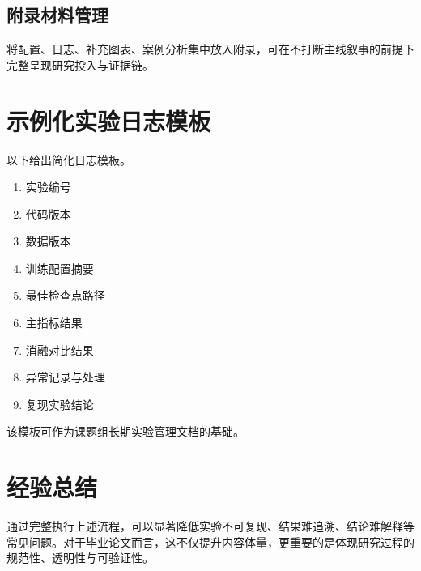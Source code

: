 \subsection{附录材料管理}
将配置、日志、补充图表、案例分析集中放入附录，可在不打断主线叙事的前提下完整呈现研究投入与证据链。

\section{示例化实验日志模板}
以下给出简化日志模板。
\begin{enumerate}
    \item 实验编号
    \item 代码版本
    \item 数据版本
    \item 训练配置摘要
    \item 最佳检查点路径
    \item 主指标结果
    \item 消融对比结果
    \item 异常记录与处理
    \item 复现实验结论
\end{enumerate}
\par\indent 该模板可作为课题组长期实验管理文档的基础。

\section{经验总结}
通过完整执行上述流程，可以显著降低实验不可复现、结果难追溯、结论难解释等常见问题。对于毕业论文而言，这不仅提升内容体量，更重要的是体现研究过程的规范性、透明性与可验证性。
